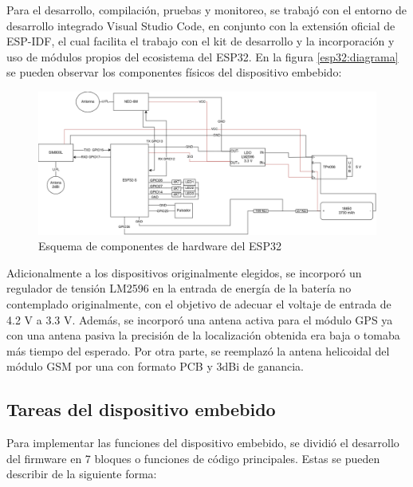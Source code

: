 {\begin{table}[H]
\begin{tabular}{l c}
		\bottomrule
		\hline
	\end{tabular}
	\label{tab:bibliotecas-esp32}
\end{table}

Para el desarrollo, compilación, pruebas y monitoreo, se trabajó con el entorno de desarrollo integrado Visual Studio Code, en conjunto con la extensión oficial de ESP-IDF, el cual facilita el trabajo con el kit de desarrollo y la incorporación y uso de módulos propios del ecosistema del ESP32. En la figura \ref{esp32:diagrama} se pueden observar los componentes físicos del dispositivo embebido:


\begin{figure}[H]
	\centering
	\includegraphics[width=1\textwidth]{./Figures/esp32-arquitectura.png}
	\caption{Esquema de componentes de hardware del ESP32}
	\label{fig:esp32:arquitectura}
\end{figure}

Adicionalmente a los dispositivos originalmente elegidos, se incorporó un regulador de tensión LM2596 en la entrada de energía de la batería no contemplado originalmente, con el objetivo de adecuar el voltaje de entrada de 4.2 V a 3.3 V. Además, se incorporó una antena activa para el módulo GPS ya con una antena pasiva la precisión de la localización obtenida era baja o tomaba más tiempo del esperado. Por otra parte, se reemplazó la antena helicoidal del módulo GSM por una con formato PCB y 3dBi de ganancia.

\subsection{Tareas del dispositivo embebido}

Para implementar las funciones del dispositivo embebido, se dividió el desarrollo del firmware en 7 bloques o funciones de código principales. Estas se pueden describir de la siguiente forma:

}
